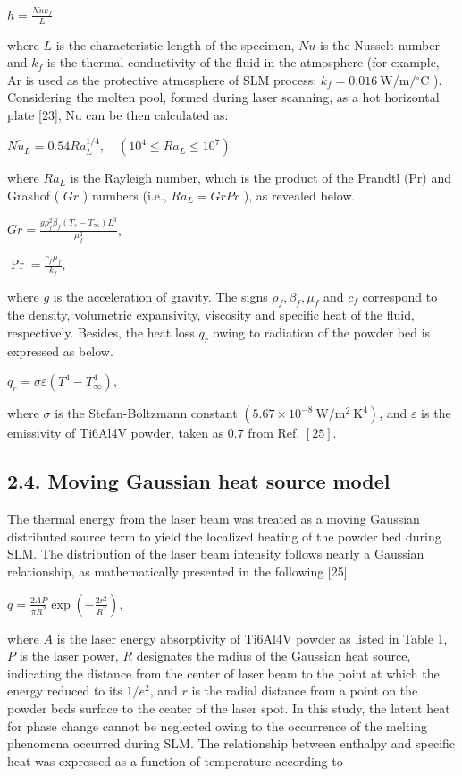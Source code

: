 \documentclass[10pt]{article}
\begin{document}
$h=\frac{N u k_{f}}{L}$

where $L$ is the characteristic length of the specimen, $N u$ is the Nusselt number and $k_{f}$ is the thermal conductivity of the fluid in the atmosphere (for example, $\mathrm{Ar}$ is used as the protective atmosphere of SLM process: $k_{f}=0.016 \mathrm{~W} / \mathrm{m} /{ }^{\circ} \mathrm{C}$ ). Considering the molten pool, formed during laser scanning, as a hot horizontal plate [23], $\mathrm{Nu}$ can be then calculated as:

$\overline{N u_{L}}=0.54 R a_{L}^{1 / 4}, \quad\left(10^{4} \leqslant R a_{L} \leqslant 10^{7}\right)$

where $R a_{L}$ is the Rayleigh number, which is the product of the Prandtl (Pr) and Grashof ( $G r$ ) numbers (i.e., $R a_{L}=G r P r$ ), as revealed below.

$G r=\frac{g \rho_{f}^{2} \beta_{f}\left(T_{s}-T_{\infty}\right) L^{3}}{\mu_{f}^{2}}$,

$\operatorname{Pr}=\frac{c_{f} \mu_{f}}{k_{f}}$,

where $g$ is the acceleration of gravity. The signs $\rho_{f}, \beta_{f}, \mu_{f}$ and $c_{f}$ correspond to the density, volumetric expansivity, viscosity and specific heat of the fluid, respectively. Besides, the heat loss $q_{r}$ owing to radiation of the powder bed is expressed as below.

$q_{r}=\sigma \varepsilon\left(T^{4}-T_{\infty}^{4}\right)$,

where $\sigma$ is the Stefan-Boltzmann constant $\left(5.67 \times 10^{-8} \mathrm{~W} / \mathrm{m}^{2} \mathrm{~K}^{4}\right)$, and $\varepsilon$ is the emissivity of Ti6Al4V powder, taken as 0.7 from Ref. $[25]$.

\subsection*{2.4. Moving Gaussian heat source model}
The thermal energy from the laser beam was treated as a moving Gaussian distributed source term to yield the localized heating of the powder bed during SLM. The distribution of the laser beam intensity follows nearly a Gaussian relationship, as mathematically presented in the following [25].

$q=\frac{2 A P}{\pi R^{2}} \exp \left(-\frac{2 r^{2}}{R^{2}}\right)$,

where $A$ is the laser energy absorptivity of Ti6Al4V powder as listed in Table 1, $P$ is the laser power, $R$ designates the radius of the Gaussian heat source, indicating the distance from the center of laser beam to the point at which the energy reduced to its $1 / e^{2}$, and $r$ is the radial distance from a point on the powder beds surface to the center of the laser spot. In this study, the latent heat for phase change cannot be neglected owing to the occurrence of the melting phenomena occurred during SLM. The relationship between enthalpy and specific heat was expressed as a function of temperature according to
\end{document}

